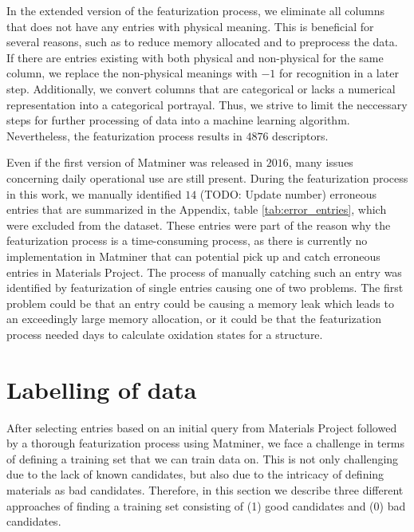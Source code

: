 In the extended version of the featurization process, we eliminate all columns that does not have any entries with physical meaning. This is beneficial for several reasons, such as to reduce memory allocated and to preprocess the data. If there are entries existing with both physical and non-physical for the same column, we replace the non-physical meanings with $-1$ for recognition in a later step. Additionally, we convert columns that are categorical or lacks a numerical representation into a categorical portrayal. Thus, we strive to limit the neccessary steps for further processing of data into a machine learning algorithm. Nevertheless, the featurization process results in $4876$ descriptors.



\noindent Even if the first version of Matminer was released in $2016$, many issues concerning daily operational use are still present. During the featurization process in this work, we manually identified $14$ (TODO: Update number) erroneous entries that are summarized in the Appendix, table \ref{tab:error_entries}, which were excluded from the dataset. These entries were part of the reason why the featurization process is a time-consuming process, as there is currently no implementation in Matminer that can potential pick up and catch erroneous entries in Materials Project. The process of manually catching such an entry was identified by featurization of single entries causing one of two problems. The first problem could be that an entry could be causing a memory leak which leads to an exceedingly large memory allocation, or it could be that the featurization process needed days to calculate oxidation states for a structure.

\section{Labelling of data}

After selecting entries based on an initial query from Materials Project followed by a thorough featurization process using Matminer, we face a challenge in terms of defining a training set that we can train data on. This is not only challenging due to the lack of known candidates, but also due to the intricacy of defining materials as bad candidates. Therefore, in this section we describe three different approaches of finding a training set consisting of (1) good candidates and (0) bad candidates.

